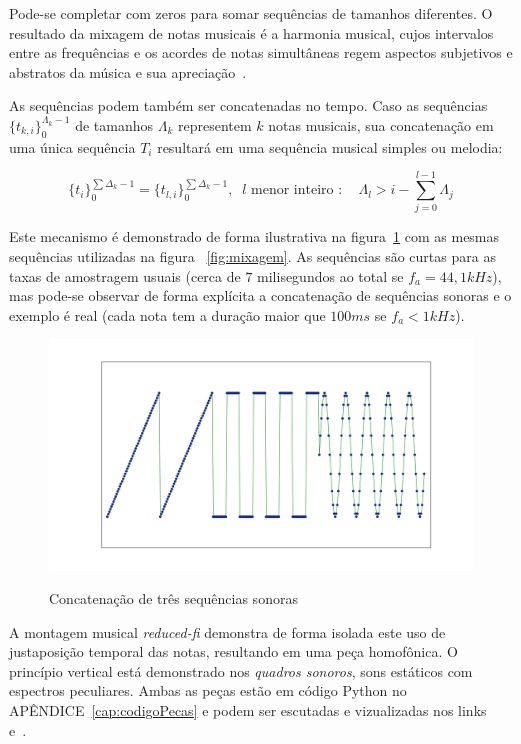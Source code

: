 Pode-se completar com zeros para somar sequências de tamanhos diferentes. O resultado da mixagem de notas musicais é a harmonia musical, cujos intervalos entre as frequências e os acordes de notas simultâneas regem aspectos subjetivos e abstratos da música e sua apreciação~\cite{Harmonia}. 

As sequências podem também ser concatenadas no tempo. Caso as sequências $\{t_{k,i}\}_0^{\Lambda_k-1}$ de tamanhos $\Lambda_k$  representem $k$ notas musicais, sua concatenação em uma única sequência $T_i$ resultará em uma sequência musical simples ou melodia:

\begin{equation}
\{t_i\}_0^{\sum\Delta_k-1}=\{t_{l,i}\}_0^{\sum\Delta_k-1}, \;\; l\text{ menor inteiro } : \quad \Lambda_l > i -\sum_{j=0}^{l-1}\Lambda_j
\end{equation}

Este mecanismo é demonstrado de forma ilustrativa na figura~\ref{fig:concatenacao} com as mesmas sequências utilizadas na figura ~\ref{fig:mixagem}.
 As sequências são curtas para as taxas de amostragem usuais (cerca de $7$ milisegundos ao total se $f_a=44,1kHz$), mas pode-se observar de forma explícita a concatenação de sequências sonoras e o exemplo é real (cada nota tem a duração maior que $100ms$ se $f_a<1kHz$).

\begin{figure}[h!]
    \centering
    \caption{Concatenação de três sequências sonoras}
        \includegraphics[width=\textwidth]{figuras/concatenacao}
        \label{fig:concatenacao}
\end{figure}

A montagem musical \emph{reduced-fi} demonstra de forma isolada este uso de justaposição temporal das notas, resultando em uma peça homofônica. O princípio vertical está demonstrado nos \emph{quadros sonoros}, sons estáticos com espectros peculiares. Ambas as peças estão em código Python no APÊNDICE~\ref{cap:codigoPecas} e podem ser escutadas e vizualizadas nos links~\cite{reduced-fi} e~\cite{quadros}.

